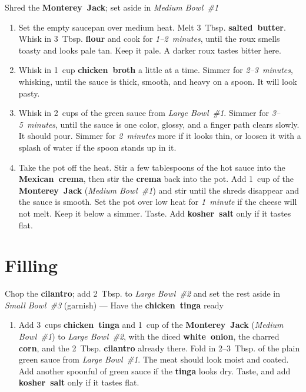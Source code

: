 \documentclass[11pt,letterpaper]{article}
\begin{document}
\noindent
Shred the \textbf{Monterey~Jack}; set aside in \textit{Medium Bowl~\#1}

\begin{enumerate}
    \item Set the empty saucepan over medium heat. Melt 3~Tbsp. \textbf{salted~butter}. Whisk in 3~Tbsp. \textbf{flour} and cook for \textit{1--2~minutes}, until the roux smells toasty and looks pale tan. Keep it pale. A darker roux tastes bitter here.

    \item Whisk in 1~cup \textbf{chicken~broth} a little at a time. Simmer for \textit{2--3~minutes}, whisking, until the sauce is thick, smooth, and heavy on a spoon. It will look pasty.

    \item Whisk in 2~cups of the green sauce from \textit{Large Bowl~\#1}. Simmer for \textit{3--5~minutes}, until the sauce is one color, glossy, and a finger path clears slowly. It should pour. Simmer for \textit{2~minutes} more if it looks thin, or loosen it with a splash of water if the spoon stands up in it.

    \item Take the pot off the heat. Stir a few tablespoons of the hot sauce into the \textbf{Mexican~crema}, then stir the \textbf{crema} back into the pot. Add 1~cup of the \textbf{Monterey~Jack} (\textit{Medium Bowl~\#1}) and stir until the shreds disappear and the sauce is smooth. Set the pot over low heat for \textit{1~minute} if the cheese will not melt. Keep it below a simmer. Taste. Add \textbf{kosher~salt} only if it tastes flat.
\end{enumerate}

\filbreak
\section*{Filling}

\noindent
Chop the \textbf{cilantro}; add 2~Tbsp. to \textit{Large Bowl~\#2} and set the rest aside in \textit{Small Bowl~\#3} (garnish) ---
Have the \textbf{chicken~tinga} ready

\begin{enumerate}
    \item Add 3~cups \textbf{chicken~tinga} and 1~cup of the \textbf{Monterey~Jack} (\textit{Medium Bowl~\#1}) to \textit{Large Bowl~\#2}, with the diced \textbf{white~onion}, the charred \textbf{corn}, and the 2~Tbsp. \textbf{cilantro} already there. Fold in 2--3~Tbsp. of the plain green sauce from \textit{Large Bowl~\#1}. The meat should look moist and coated. Add another spoonful of green sauce if the \textbf{tinga} looks dry. Taste, and add \textbf{kosher~salt} only if it tastes flat.
\end{enumerate}
\end{document}
